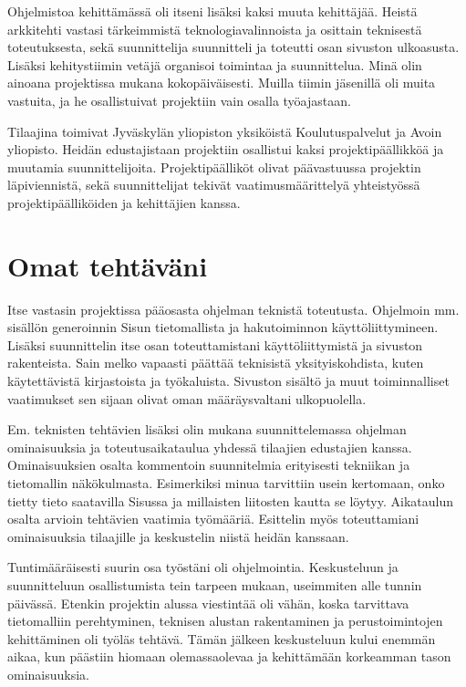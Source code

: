 \documentclass[11pt]{article}
\begin{document}
Ohjelmistoa kehittämässä oli itseni lisäksi kaksi muuta kehittäjää. Heistä arkkitehti
vastasi tärkeimmistä teknologiavalinnoista ja osittain teknisestä toteutuksesta,
sekä suunnittelija suunnitteli ja toteutti osan sivuston ulkoasusta.
Lisäksi kehitystiimin vetäjä organisoi toi\-mintaa ja suunnittelua.
Minä olin ainoana projektissa mukana kokopäiväisesti. Muilla tiimin jäsenillä
oli muita vastuita, ja he osallistuivat projektiin vain osalla työajastaan.

Tilaajina toimivat Jyväskylän yliopiston yksiköistä Koulutuspalvelut ja Avoin
yliopisto. Heidän edustajistaan projektiin osallistui kaksi projektipäällikköä
ja muutamia suunnittelijoita. Projektipäälli\-köt olivat päävastuussa projektin
läpiviennistä, sekä suunnittelijat tekivät vaatimusmäärittelyä yhteistyös\-sä
projektipäälliköiden ja kehittäjien kanssa.

\section{Omat tehtäväni}

Itse vastasin projektissa pääosasta ohjelman teknistä toteutusta. Ohjelmoin mm.
sisällön generoinnin Sisun tietomallista ja hakutoiminnon käyttöliittymineen.
Lisäksi suunnittelin itse osan toteuttamistani käyttöliittymistä ja sivuston
rakenteista. Sain melko vapaasti päättää teknisistä yksityiskohdista, kuten
käytettävistä kirjastoista ja työkaluista. Sivuston sisältö ja muut
toiminnalliset vaatimukset sen sijaan olivat oman määräysvaltani ulko\-puolella.

Em. teknisten tehtävien lisäksi olin mukana suunnittelemassa ohjelman
ominaisuuksia ja toteutusaikataulua yhdessä tilaajien edustajien kanssa.
Ominaisuuksien osalta kommentoin suunnitelmia erityisesti tekniikan ja
tietomallin näkökulmasta. Esimerkiksi minua tar\-vittiin usein kertomaan, onko tietty tieto
saatavilla Sisussa ja millaisten liitosten kautta se löytyy. Aikataulun osalta
arvioin tehtävien vaatimia työmääriä. Esittelin myös toteuttamiani
ominaisuuksia tilaajille ja keskustelin niistä heidän kanssaan.

Tuntimääräisesti suurin osa työstäni oli ohjelmointia. Keskusteluun ja
suunnitteluun osallistumista tein tarpeen mukaan, useimmiten alle tunnin
päivässä. Etenkin projektin alussa viestintää oli vähän, koska tarvittava
tietomalliin perehtyminen, teknisen alustan rakentaminen ja perustoimintojen
kehittäminen oli työläs tehtävä. Tämän jälkeen keskusteluun kului enemmän
aikaa, kun päästiin hio\-maan olemassaolevaa ja kehittämään korkeamman tason
ominaisuuksia.
\end{document}
